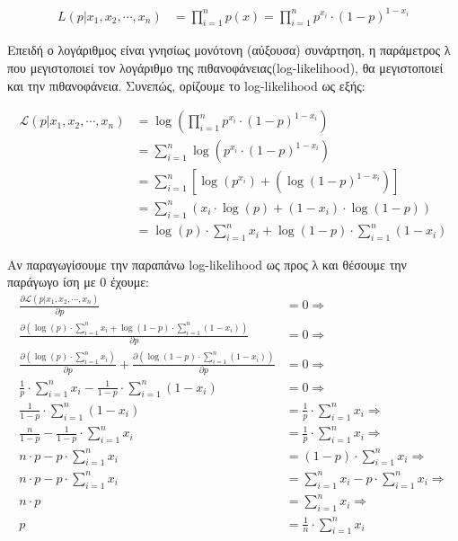 \documentclass{article}
\begin{document}
	\begin{align*}
		L(p|x_{1}, x_{2}, \cdots, x_{n}) &= \prod_{i=1}^{n} p(x)  = \prod_{i=1}^{n} p^{x_{i}} \cdot (1-p)^{1-x_{i}}
	\end{align*}

	\noindent
	Επειδή ο λογάριθμος είναι γνησίως μονότονη (αύξουσα) συνάρτηση, η παράμετρος λ που μεγιστοποιεί τον λογάριθμο της πιθανοφάνειας(log-likelihood), θα μεγιστοποιεί και την πιθανοφάνεια. Συνεπώς, ορίζουμε το log-likelihood ως εξής:
	
	\begin{align*}
		\mathcal{L}(p|x_{1},x_{2}, \cdots, x_{n}) &= \log \left( \prod_{i=1}^{n} p^{x_{i}} \cdot (1-p)^{1-x_{i}} \right) \\
		&= \sum_{i=1}^{n} \log \left( p^{x_{i}} \cdot (1-p)^{1-x_{i}} \right) \\
		&= \sum_{i=1}^{n} \left[ \log ( p^{x_{i}} ) + \left( \log (1-p)^{1-x_{i}} \right) \right] \\
		&= \sum_{i=1}^{n} \left( x_{i} \cdot \log (p) + (1-x_{i}) \cdot \log (1-p) \right) \\
		&= \log (p) \cdot \sum_{i=1}^{n} x_{i} + \log (1-p) \cdot \sum_{i=1}^{n} (1-x_{i})
	\end{align*}

	\pagebreak
	\noindent
	Aν παραγωγίσουμε την παραπάνω log-likelihood ως προς λ και θέσουμε την παράγωγο ίση με 0 έχουμε:
	\begin{align*}
		\frac{\partial \mathcal{L}(p|x_{1},x_{2}, \cdots, x_{n})}{\partial p} &= 0 \Rightarrow \\
		\frac{\partial (\log (p) \cdot \sum_{i=1}^{n} x_{i} + \log (1-p) \cdot \sum_{i=1}^{n} (1-x_{i}))}{\partial p} &= 0 \Rightarrow \\
		\frac{\partial (\log (p) \cdot \sum_{i=1}^{n} x_{i})}{\partial p} + 
		\frac{\partial (\log (1-p) \cdot \sum_{i=1}^{n} (1-x_{i}))}{\partial p} &= 0 \Rightarrow \\	
		\frac{1}{p} \cdot \sum_{i=1}^{n} x_{i} - \frac{1}{1 - p} \cdot \sum_{i=1}^{n} (1-x_{i}) &= 0 \Rightarrow \\	
		\frac{1}{1 - p} \cdot \sum_{i=1}^{n} (1-x_{i}) & = \frac{1}{p} \cdot \sum_{i=1}^{n} x_{i} \Rightarrow \\		
		\frac{n}{1 - p}  - \frac{1}{1 - p} \cdot \sum_{i=1}^{n} x_{i} &= \frac{1}{p} \cdot \sum_{i=1}^{n} x_{i} \Rightarrow \\
		n \cdot p  - p \cdot \sum_{i=1}^{n} x_{i} &= (1 - p) \cdot \sum_{i=1}^{n} x_{i} \Rightarrow \\
		n \cdot p  - p \cdot \sum_{i=1}^{n} x_{i} &= \sum_{i=1}^{n} x_{i} - p \cdot \sum_{i=1}^{n} x_{i } \Rightarrow \\
		n \cdot p &= \sum_{i=1}^{n} x_{i} \Rightarrow \\
		p &= \frac{1}{n} \cdot \sum_{i=1}^{n} x_{i}
	\end{align*}
\end{document}
